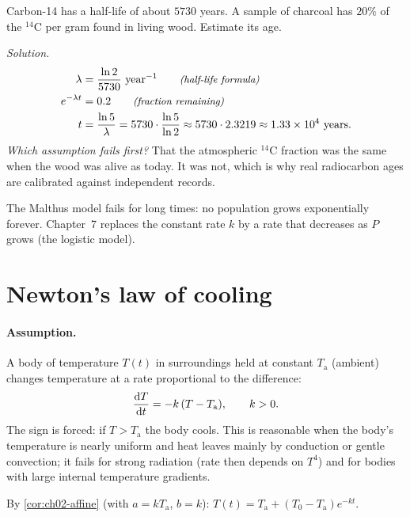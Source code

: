 \begin{example}\label{ex:ch02-carbon}
Carbon-14 has a half-life of about $5730$ years. A sample of charcoal has
$20\%$ of the $^{14}$C per gram found in living wood. Estimate its age.

\emph{Solution.}
\begin{align*}
  \lambda &= \frac{\ln 2}{5730}\ \text{year}^{-1} \qquad\text{\small\itshape(half-life formula)}\\
  e^{-\lambda t} &= 0.2 \qquad\text{\small\itshape(fraction remaining)}\\
  t &= \frac{\ln 5}{\lambda} = 5730\cdot\frac{\ln 5}{\ln 2}
     \approx 5730\cdot 2.3219 \approx 1.33\times10^4\ \text{years}.
\end{align*}
\emph{Which assumption fails first?} That the atmospheric $^{14}$C fraction was
the same when the wood was alive as today. It was not, which is why real
radiocarbon ages are calibrated against independent records.
\end{example}

The Malthus model fails for long times: no population grows exponentially
forever. Chapter~7 replaces the constant rate $k$ by a rate that decreases as
$P$ grows (the logistic model).

\section{Newton's law of cooling}\label{sec:ch02-cooling}

\paragraph{Assumption.} A body of temperature $T(t)$ in surroundings held at
constant $T_{\mathrm{a}}$ (ambient) changes temperature at a rate proportional
to the difference:
\begin{equation}\label{eq:ch02-cooling}
  \frac{\mathrm{d}T}{\mathrm{d}t} = -k\,(T - T_{\mathrm{a}}),\qquad k>0 .
\end{equation}
The sign is forced: if $T > T_{\mathrm{a}}$ the body cools. This is reasonable
when the body's temperature is nearly uniform and heat leaves mainly by
conduction or gentle convection; it fails for strong radiation (rate then
depends on $T^4$) and for bodies with large internal temperature gradients.

By \cref{cor:ch02-affine} (with $a = kT_{\mathrm{a}}$, $b = k$):
$T(t) = T_{\mathrm{a}} + (T_0 - T_{\mathrm{a}})e^{-kt}$.

